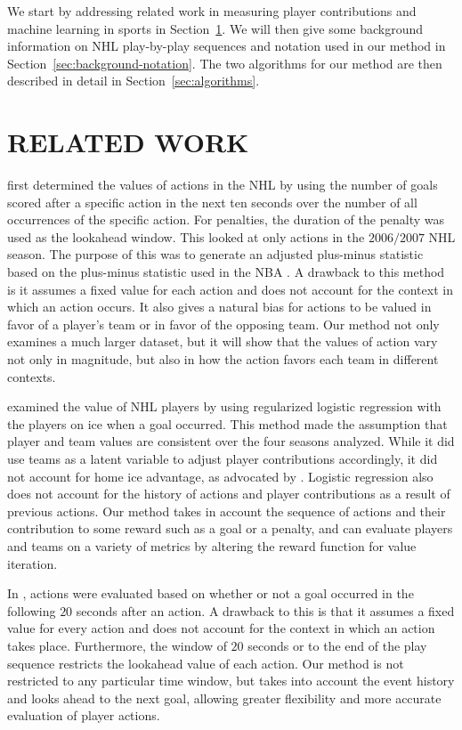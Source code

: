 \documentclass[]{article}
\begin{document}
We start by addressing related work in measuring player contributions and machine learning in sports in Section~\ref{sec:related-work}. We will then give some background information on NHL play-by-play sequences and notation used in our method in Section~\ref{sec:background-notation}. The two algorithms for our method are then described in detail in Section~\ref{sec:algorithms}.


\section{RELATED WORK}
\label{sec:related-work}

\citep{Lock2009} first determined the values of actions in the NHL by using the number of goals scored after a specific action in the next ten seconds over the number of all occurrences of the specific action. For penalties, the duration of the penalty was used as the lookahead window. This looked at only actions in the $2006/2007$ NHL season. The purpose of this was to generate an adjusted plus-minus statistic based on the plus-minus statistic used in the NBA \citep{Rosenbaum2004}. A drawback to this method is it assumes a fixed value for each action and does not account for the context in which an action occurs. It also gives a natural bias for actions to be valued in favor of a player's team or in favor of the opposing team. Our method not only examines a much larger dataset, but it will show that the values of action vary not only in magnitude, but also in how the action favors each team in different contexts.

\citep{Gramacy2013} examined the value of NHL players by using regularized logistic regression with the players on ice when a goal occurred. This method made the assumption that player and team values are consistent over the four seasons analyzed. While it did use teams as a latent variable to adjust player contributions accordingly, it did not account for home ice advantage, as advocated by \citep{Schuckers2013}. Logistic regression also does not account for the history of actions and player contributions as a result of previous actions. Our method takes in account the sequence of actions and their contribution to some reward such as a goal or a penalty, and can evaluate players and teams on a variety of metrics by altering the reward function for value iteration.

In \citep{Schuckers2013}, actions were evaluated based on whether or not a goal occurred in the following $20$ seconds after an action. A drawback to this is that it assumes a fixed value for every action and does not account for the context in which an action takes place. Furthermore, the window of $20$ seconds or to the end of the play sequence restricts the lookahead value of each action. Our method is not restricted to any particular time window, but takes into account the event history and looks ahead to the next goal, allowing greater flexibility and more accurate evaluation of player actions.
\end{document}
